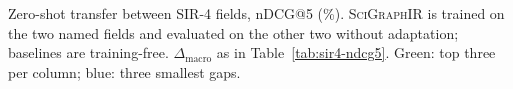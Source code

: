 \begin{table}[H]
\caption{Zero-shot transfer between SIR-4 fields, nDCG@5 (\%). \textsc{SciGraphIR} is
trained on the two named fields and evaluated on the other two without adaptation;
baselines are training-free. $\Delta_{\mathrm{macro}}$ as in Table~\ref{tab:sir4-ndcg5}.
Green: top three per column; blue: three smallest gaps.}
\label{tab:sir4-zeroshot}
\end{table}
